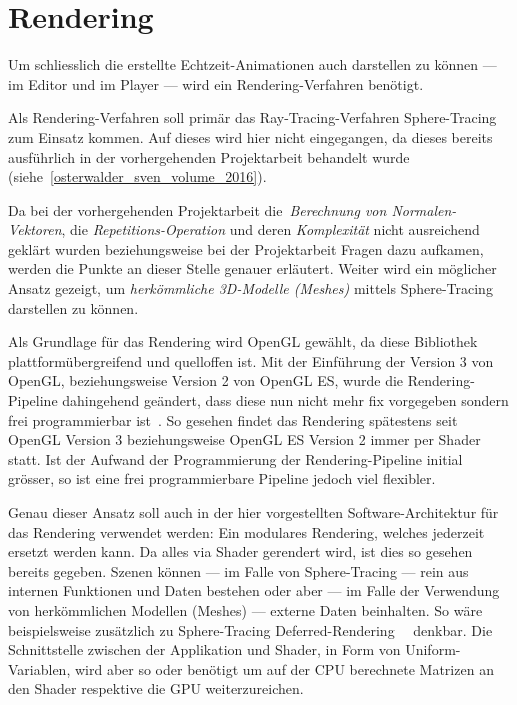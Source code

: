 
\chapter{Rendering}
\label{chap:rendering}


Um schliesslich die erstellte Echtzeit-Animationen auch darstellen zu können
--- im Editor und im Player --- wird ein Rendering-Verfahren benötigt.

Als Rendering-Verfahren soll primär das Ray-Tracing-Verfahren Sphere-Tracing
zum Einsatz kommen. Auf dieses wird hier nicht eingegangen, da dieses
bereits ausführlich in der vorhergehenden Projektarbeit behandelt wurde
(siehe~\ref{osterwalder_sven_volume_2016}).

Da bei der vorhergehenden Projektarbeit die~\textit{Berechnung von
    Normalen-Vektoren}, die \textit{Repetitions-Operation} und deren
\textit{Komplexität} nicht ausreichend geklärt wurden beziehungsweise bei der
Projektarbeit Fragen dazu aufkamen, werden die Punkte an dieser Stelle genauer
erläutert. Weiter wird ein möglicher Ansatz gezeigt, um \textit{herkömmliche
    3D-Modelle (Meshes)} mittels Sphere-Tracing darstellen zu können.

Als Grundlage für das Rendering wird OpenGL gewählt, da diese Bibliothek
plattformübergreifend und quelloffen ist. Mit der Einführung der Version 3 von
OpenGL, beziehungsweise Version 2 von OpenGL ES, wurde die Rendering-Pipeline
dahingehend geändert, dass diese nun nicht mehr fix vorgegeben sondern frei
programmierbar
ist\cite{opengl_foundation_fixed_2015}~\cite{opengl_foundation_rendering_2015}.
So gesehen findet das Rendering spätestens seit OpenGL Version 3
beziehungsweise OpenGL ES Version 2 immer per Shader statt. Ist der Aufwand der 
Programmierung der Rendering-Pipeline initial grösser, so ist eine frei
programmierbare Pipeline jedoch viel flexibler.

Genau dieser Ansatz soll auch in der hier vorgestellten Software-Architektur
für das Rendering verwendet werden: Ein modulares Rendering, welches jederzeit
ersetzt werden kann. Da alles via Shader gerendert wird, ist dies so gesehen
bereits gegeben. Szenen können --- im Falle von Sphere-Tracing --- rein aus
internen Funktionen und Daten bestehen oder aber --- im Falle der Verwendung
von herkömmlichen Modellen (Meshes) --- externe Daten beinhalten. So wäre
beispielsweise zusätzlich zu Sphere-Tracing
Deferred-Rendering~~\parencite{saito_comprehensible_1990}
denkbar. Die Schnittstelle zwischen der Applikation und Shader, in Form von
Uniform-Variablen, wird aber so oder benötigt um auf der CPU berechnete
Matrizen an den Shader respektive die GPU weiterzureichen.

